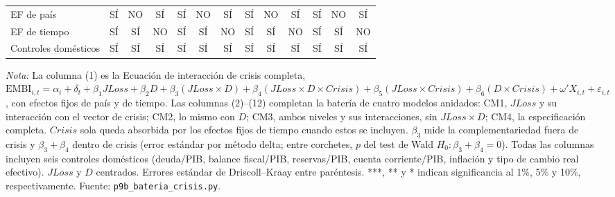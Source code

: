 \begin{landscape}
\begin{table}
\begin{tabular}{l c ccc ccc ccc cc}
\midrule
EF de país & SÍ & NO & SÍ & SÍ & NO & SÍ & SÍ & NO & SÍ & SÍ & NO & SÍ \\
EF de tiempo & SÍ & SÍ & NO & SÍ & SÍ & NO & SÍ & SÍ & NO & SÍ & SÍ & NO \\
Controles domésticos & SÍ & SÍ & SÍ & SÍ & SÍ & SÍ & SÍ & SÍ & SÍ & SÍ & SÍ & SÍ \\
\bottomrule
\end{tabular}
\par\smallskip\parbox{\linewidth}{\scriptsize \textit{Nota:} La columna (1) es la Ecuación de interacción de crisis completa, $\mathrm{EMBI}_{i,t}=\alpha_i+\delta_t+\beta_1 JLoss+\beta_2 D+\beta_3(JLoss\times D)+\beta_4(JLoss\times D\times Crisis)+\beta_5(JLoss\times Crisis)+\beta_6(D\times Crisis)+\omega'X_{i,t}+\varepsilon_{i,t}$, con efectos fijos de país y de tiempo. Las columnas (2)--(12) completan la batería de cuatro modelos anidados: CM1, $JLoss$ y su interacción con el vector de crisis; CM2, lo mismo con $D$; CM3, ambos niveles y sus interacciones, sin $JLoss\times D$; CM4, la especificación completa. $Crisis$ sola queda absorbida por los efectos fijos de tiempo cuando estos se incluyen. $\beta_3$ mide la complementariedad fuera de crisis y $\beta_3+\beta_4$ dentro de crisis (error estándar por método delta; entre corchetes, $p$ del test de Wald $H_0\!:\beta_3+\beta_4=0$). Todas las columnas incluyen seis controles domésticos (deuda/PIB, balance fiscal/PIB, reservas/PIB, cuenta corriente/PIB, inflación y tipo de cambio real efectivo). $JLoss$ y $D$ centrados. Errores estándar de Driscoll--Kraay entre paréntesis. ***, ** y * indican significancia al 1\%, 5\% y 10\%, respectivamente. Fuente: \texttt{p9b\_bateria\_crisis.py}.}
\end{table}
\end{landscape}
